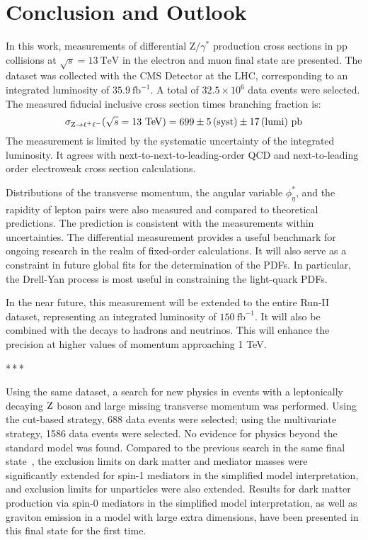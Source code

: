 \chapter{Conclusion and Outlook}

In this work, measurements of differential $\mathrm{Z}/\gamma^{*}$ production cross sections in $\mathrm{p}\mathrm{p}$ collisions at $\sqrt{s}=13~\mathrm{TeV}$ in the electron and muon final state
are presented.
The dataset was collected with the CMS Detector at the LHC, corresponding to an integrated luminosity of $35.9~\mathrm{fb}^{-1}$.
A total of $32.5 \times 10^{6}$ data events were selected.
The measured fiducial inclusive cross section times branching fraction is: 
\begin{equation*}
\sigma_{\mathrm{Z} \to \ell^{+}\ell^{-}}(\sqrt{s}=13~\mathrm{TeV}) = 699\pm5\,\text{(syst)}\pm17\,\text{(lumi)}~\mathrm{pb}
\end{equation*}
The measurement is limited by the systematic uncertainty of the integrated luminosity.
It agrees with next-to-next-to-leading-order QCD and next-to-leading order electroweak cross section calculations. 

Distributions of the transverse momentum, the angular variable $\phi^{*}_\eta$, and the rapidity of lepton pairs were also measured and compared to theoretical predictions.
The prediction is consistent with the measurements within uncertainties.
The differential measurement provides a useful benchmark for ongoing research in the realm of fixed-order calculations.
It will also serve as a constraint in future global fits for the determination of the PDFs.
In particular, the Drell-Yan process is most useful in constraining the light-quark PDFs.

In the near future, this measurement will be extended to the entire Run-II dataset,
representing an integrated luminosity of $150~\mathrm{fb}^{-1}$.
It will also be combined with the decays to hadrons and neutrinos.
This will enhance the precision at higher values of momentum approaching 1 TeV.

\bigskip\par\centerline{*\,*\,*}\medskip\par

Using the same dataset, a search for new physics in events with a
leptonically decaying $\mathrm{Z}$ boson and large missing transverse momentum was performed.
Using the cut-based strategy, 688 data events were selected;
using the multivariate strategy, 1586 data events were selected.
No evidence for physics beyond the standard model was found.
Compared to the previous search in the same final state~\cite{CMS-PAPER-EXO-16-010},
the exclusion limits on dark matter and mediator masses were significantly extended for spin-1 mediators in the simplified model interpretation, and exclusion limits for unparticles were also extended.
Results for dark matter production via spin-0 mediators in the simplified model interpretation,
as well as graviton emission in a model with large extra dimensions,
have been presented in this final state for the first time.

